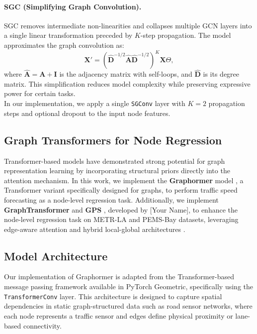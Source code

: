 \documentclass[runningheads]{llncs}
\begin{document}
\paragraph{SGC (Simplifying Graph Convolution).}
SGC removes intermediate non-linearities and collapses multiple GCN layers into a single linear transformation preceded by $K$-step propagation. The model approximates the graph convolution as:
\[
\mathbf{X}' = \left(\hat{\mathbf{D}}^{-1/2} \hat{\mathbf{A}} \hat{\mathbf{D}}^{-1/2}\right)^K \mathbf{X} \Theta,
\]
where $\hat{\mathbf{A}} = \mathbf{A} + \mathbf{I}$ is the adjacency matrix with self-loops, and $\hat{\mathbf{D}}$ is its degree matrix. This simplification reduces model complexity while preserving expressive power for certain tasks.\\
In our implementation, we apply a single \texttt{SGConv} layer with $K=2$ propagation steps and optional dropout to the input node features.

\subsection{Graph Transformers for Node Regression}
Transformer-based models have demonstrated strong potential for graph representation learning by incorporating structural priors directly into the attention mechanism. In this work, we implement the \textbf{Graphormer} model \cite{ying2021graphormer}, a Transformer variant specifically designed for graphs, to perform traffic speed forecasting as a node-level regression task. Additionally, we implement \textbf{GraphTransformer} \cite{dwivedi2021generalization} and \textbf{GPS} \cite{rampasek2022gps}, developed by [Your Name], to enhance the node-level regression task on METR-LA and PEMS-Bay datasets, leveraging edge-aware attention and hybrid local-global architectures \cite{zhou2020gnn}.

\subsection{Model Architecture}

Our implementation of Graphormer is adapted from the Transformer-based message passing framework available in PyTorch Geometric, specifically using the \texttt{TransformerConv} layer. This architecture is designed to capture spatial dependencies in static graph-structured data such as road sensor networks, where each node represents a traffic sensor and edges define physical proximity or lane-based connectivity.
\end{document}
